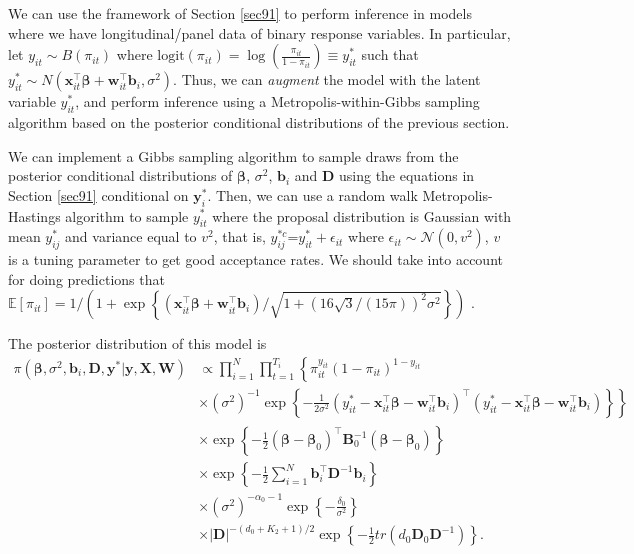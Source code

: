 We can use the framework of Section \ref{sec91} to perform inference in models where we have longitudinal/panel data of binary response variables. In particular, let $y_{it}\sim{B}(\pi_{it})$ where $\text{logit}(\pi_{it})=\log\left(\frac{\pi_{it}}{1-\pi_{it}}\right)\equiv y_{it}^*$ such that $y_{it}^*\sim N(\bm{x}_{it}^{\top}\bm{\beta}+\bm{w}_{it}^{\top}\bm{b}_i, \sigma^2)$. Thus, we can \textit{augment} the model with the latent variable $y_{it}^*$, and perform inference using a Metropolis-within-Gibbs sampling algorithm based on the posterior conditional distributions of the previous section. 

We can implement a Gibbs sampling algorithm to sample draws from the posterior conditional distributions of $\bm{\beta}$, $\sigma^2$, $\bm{b}_i$ and $\bm{D}$ using the equations in Section \ref{sec91} conditional on $\bm{y}_i^*$. Then, we can use a random walk Metropolis-Hastings algorithm to sample $y_{it}^*$ where the proposal distribution is Gaussian with mean $y_{ij}^*$ and variance equal to $v^2$, that is, $y_{ij}^{*c}$=$y_{it}^*+\epsilon_{it}$ where $\epsilon_{it}\sim\mathcal{N}(0,v^2)$, $v$ is a tuning parameter to get good acceptance rates. We should take into account for doing predictions that $\mathbb{E}[{\pi}_{it}]=1/(1+\exp\left\{(\bm{x}_{it}^{\top}\bm{\beta}+\bm{w}_{it}^{\top}\bm{b}_i)/\sqrt{1+(16\sqrt{3}/(15\pi))^2\sigma^2}\right\})$ \cite[~pag. 136]{diggle2002analysis}.

The posterior distribution of this model is
\begin{align*}
	\pi(\bm{\beta},\sigma^2, \bm{b}_i, \bm{D}, \bm{y}^*|\bm{y}, \bm{X}, \bm{W})&\propto \prod_{i=1}^N \prod_{t=1}^{T_i}\left\{\pi_{it}^{y_{it}}(1-\pi_{it})^{1-y_{it}}\right.\\
	&\left.\times (\sigma^2)^{-1}\exp\left\{-\frac{1}{2\sigma^2}(y_{it}^*-\bm{x}_{it}^{\top}\bm{\beta}-\bm{w}_{it}^{\top}\bm{b}_i)^{\top}(y_{it}^*-\bm{x}_{it}^{\top}\bm{\beta}-\bm{w}_{it}^{\top}\bm{b}_i)\right\}\right\}\\
	&\times \exp\left\{-\frac{1}{2}(\bm{\beta}-\bm{\beta}_0)^{\top}\bm{B}_0^{-1}(\bm{\beta}-\bm{\beta}_0)\right\}\\
	&\times \exp\left\{-\frac{1}{2}\sum_{i=1}^N \bm{b}_i^{\top}\bm{D}^{-1}\bm{b}_i\right\}\\
	&\times (\sigma^2)^{-\alpha_0-1}\exp\left\{-\frac{\delta_0}{\sigma^2}\right\}\\
	&\times |\bm{D}|^{-(d_0+K_2+1)/2}\exp\left\{-\frac{1}{2}tr(d_0\bm{D}_0\bm{D}^{-1})\right\}.	
\end{align*}

